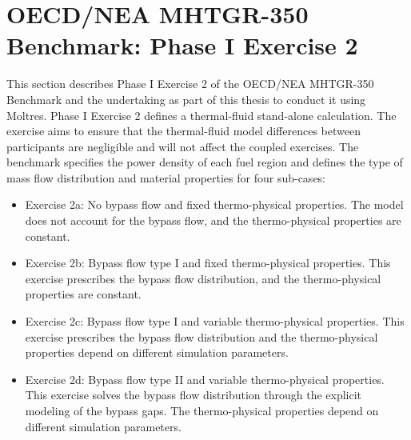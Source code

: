 

\section{OECD/NEA MHTGR-350 Benchmark: Phase I Exercise 2}
\label{sec:ph1ex2}

This section describes Phase I Exercise 2 of the OECD/NEA MHTGR-350 Benchmark \cite{oecd_nea_benchmark_2017} and the undertaking as part of this thesis to conduct it using Moltres.
Phase I Exercise 2 defines a thermal-fluid stand-alone calculation.
The exercise aims to ensure that the thermal-fluid model differences between participants are negligible and will not affect the coupled exercises.
The benchmark specifies the power density of each fuel region and defines the type of mass flow distribution and material properties for four sub-cases:
\begin{itemize}
  \item Exercise 2a: No bypass flow and fixed thermo-physical properties. The model does not account for the bypass flow, and the thermo-physical properties are constant.
  \item Exercise 2b: Bypass flow type I and fixed thermo-physical properties. This exercise prescribes the bypass flow distribution, and the thermo-physical properties are constant.
  \item Exercise 2c: Bypass flow type I and variable thermo-physical properties. This exercise prescribes the bypass flow distribution and the thermo-physical properties depend on different simulation parameters.
  \item Exercise 2d: Bypass flow type II and variable thermo-physical properties. This exercise solves the bypass flow distribution through the explicit modeling of the bypass gaps. The thermo-physical properties depend on different simulation parameters.
\end{itemize}

